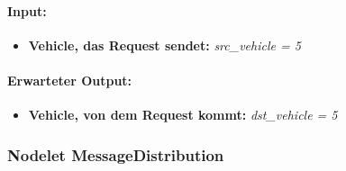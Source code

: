 \documentclass[a4paper, 12pt, titlepage]{scrartcl}
\begin{document}
			\paragraph{Input:}
			\begin{itemize} \itemsep-0.5em
				\item \textbf{Vehicle, das Request sendet:} \emph{src\_vehicle = 5}
			\end{itemize}
			\paragraph{Erwarteter Output:}
			\begin{itemize} \itemsep-0.5em
				\item \textbf{Vehicle, von dem Request kommt:} \emph{dst\_vehicle = 5}
			\end{itemize}

			\subsubsection{Nodelet MessageDistribution}
			\label{node_message_distribution}
\end{document}
